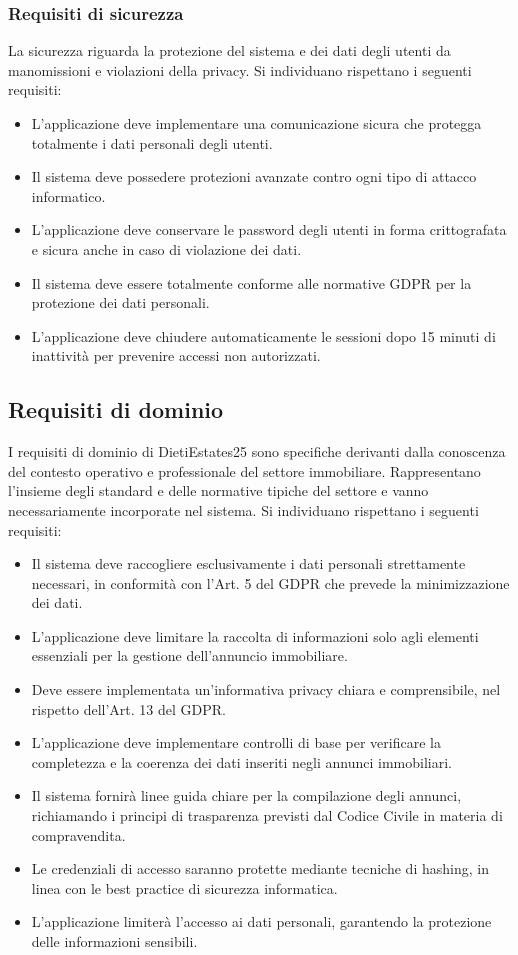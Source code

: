 \documentclass{book}
\begin{document}
\subsubsection{Requisiti di sicurezza}
La sicurezza riguarda la protezione del sistema e dei dati degli utenti da manomissioni e violazioni della privacy. Si individuano rispettano i seguenti requisiti:
\begin{itemize}
    \item L'applicazione deve implementare una comunicazione sicura che protegga totalmente i dati personali degli utenti.
    \item Il sistema deve possedere protezioni avanzate contro ogni tipo di attacco informatico.
    \item L'applicazione deve conservare le password degli utenti in forma crittografata e sicura anche in caso di violazione dei dati.
    \item Il sistema deve essere totalmente conforme alle normative GDPR per la protezione dei dati personali.
    \item L'applicazione deve chiudere automaticamente le sessioni dopo 15 minuti di inattività per prevenire accessi non autorizzati.
\end{itemize}

\subsection{Requisiti di dominio}
I requisiti di dominio di DietiEstates25 sono specifiche derivanti dalla conoscenza del contesto operativo e professionale del settore immobiliare. Rappresentano l'insieme degli standard e delle normative tipiche del settore e vanno necessariamente incorporate nel sistema. Si individuano rispettano i seguenti requisiti:
\begin{itemize}
    \item Il sistema deve raccogliere esclusivamente i dati personali strettamente necessari, in conformità con l'Art. 5 del GDPR che prevede la minimizzazione dei dati.
    \item L'applicazione deve limitare la raccolta di informazioni solo agli elementi essenziali per la gestione dell'annuncio immobiliare.
    \item Deve essere implementata un'informativa privacy chiara e comprensibile, nel rispetto dell'Art. 13 del GDPR\@.
    \item L'applicazione deve implementare controlli di base per verificare la completezza e la coerenza dei dati inseriti negli annunci immobiliari.
    \item Il sistema fornirà linee guida chiare per la compilazione degli annunci, richiamando i principi di trasparenza previsti dal Codice Civile in materia di compravendita.
    \item Le credenziali di accesso saranno protette mediante tecniche di hashing, in linea con le best practice di sicurezza informatica.
    \item L'applicazione limiterà l'accesso ai dati personali, garantendo la protezione delle informazioni sensibili.
\end{itemize}
\end{document}
